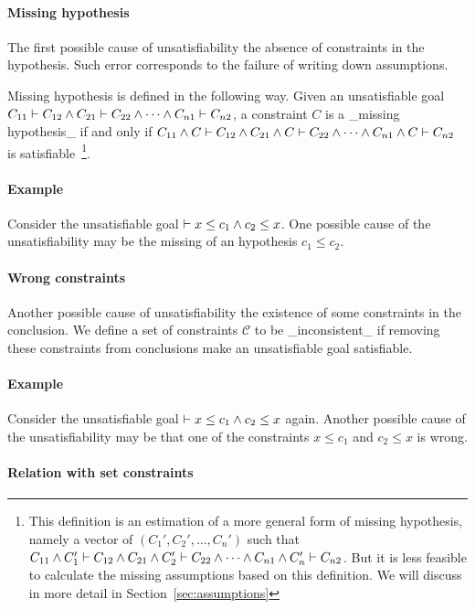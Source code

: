 \paragraph{Missing hypothesis}

The first possible cause of unsatisfiability the absence of constraints in the
hypothesis. Such error corresponds to the failure of writing down assumptions.

Missing hypothesis is defined in the following way.
Given an unsatisfiable goal $C_{11} \vdash C_{12} \land C_{21} \vdash C_{22}
\land \dots \land C_{n1} \vdash C_{n2}$, a constraint $C$ is a _missing
hypothesis_ if and only if $C_{11} \land C \vdash C_{12} \land C_{21} \land C
\vdash C_{22} \land \dots \land C_{n1} \land C \vdash C_{n2}$ is
satisfiable~\footnote{This definition is an estimation of a more general form
of missing hypothesis, namely a vector of $(C_1', C_2', \dots, C_n')$ such that
$C_{11} \land C_1' \vdash C_{12} \land C_{21} \land C_2' \vdash C_{22} \land
\dots \land C_{n1} \land C_n' \vdash C_{n2}$. But it is less feasible to
calculate the missing assumptions based on this definition. We will discuss in
more detail in Section~\ref{sec:assumptions}}.

\paragraph{Example}
Consider the unsatisfiable goal $\vdash x \leq c_1 \land c_2 \leq x$.
One possible cause of the unsatisfiability may be the missing of an
hypothesis $c_1\leq c_2$.

\paragraph{Wrong constraints}

Another possible cause of unsatisfiability the existence of some constraints in
the conclusion. We define a set of constraints $\mathcal{C}$ to be
_inconsistent_ if removing these constraints from conclusions make an
unsatisfiable goal satisfiable.

\paragraph{Example}
Consider the unsatisfiable goal $\vdash x \leq c_1 \land c_2 \leq x$
again. Another possible cause of the unsatisfiability may be that one of the
constraints $x \leq c_1$ and $c_2 \leq x$ is wrong. 

\paragraph{Relation with set constraints}

